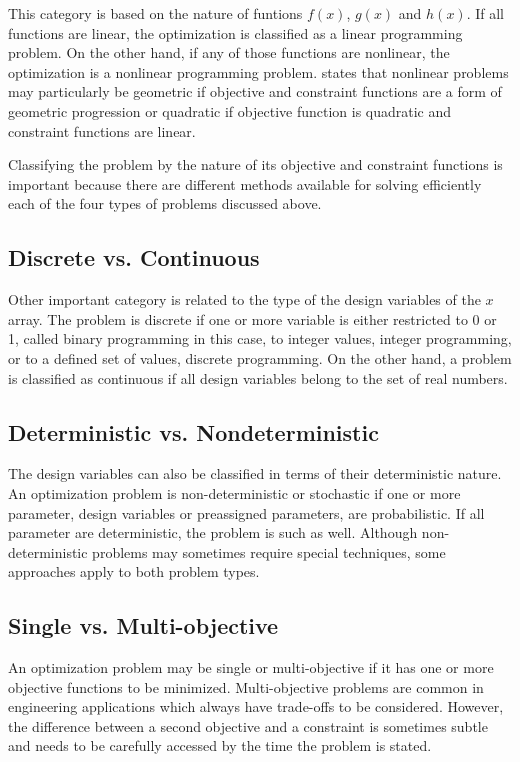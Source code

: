 This category is based on the nature of funtions $f(x)$, $g(x)$ and $h(x)$. If all functions are linear, the optimization is classified as a linear programming problem. On the other hand, if any of those functions are nonlinear, the optimization is a nonlinear programming problem.  states that nonlinear problems may particularly be geometric if objective and constraint functions are a form of geometric progression or quadratic if objective function is quadratic and constraint functions are linear.

Classifying the problem by the nature of its objective and constraint functions is important because there are different methods available for solving efficiently each of the four types of problems discussed above.

\subsection{Discrete vs. Continuous}

Other important category is related to the type of the design variables of the $x$ array. The problem is discrete if one or more variable is either restricted to 0 or 1, called binary programming in this case, to integer values, integer programming, or to a defined set of values, discrete programming. 
On the other hand, a problem is classified as continuous if all design variables belong to the set of real numbers. 

\subsection{Deterministic vs. Nondeterministic}

The design variables can also be classified in terms of their deterministic nature. An optimization problem is non-deterministic or stochastic if one or more parameter, design variables or preassigned parameters, are probabilistic. If all parameter are deterministic, the problem is such as well. Although non-deterministic problems may sometimes require special techniques, some approaches apply to both problem types.

\subsection{Single vs. Multi-objective}

An optimization problem may be single or multi-objective if it has one or more objective functions to be minimized. Multi-objective problems are common in engineering applications which always have trade-offs to be considered. However, the difference between a second objective and a constraint is sometimes subtle and needs to be carefully accessed by the time the problem is stated.

